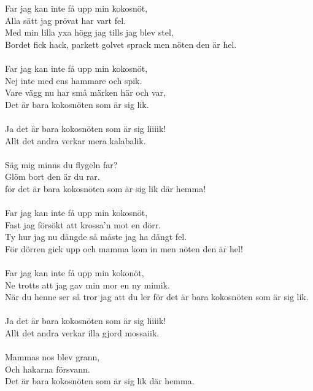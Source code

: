 \vspace{10pt}
\par
Far jag kan inte få upp min kokosnöt,\\
Alla sätt jag prövat har vart fel.\\
Med min lilla yxa högg jag tills jag blev stel,\\
Bordet fick hack, parkett golvet sprack men nöten den är hel.\\
\\
Far jag kan inte få upp min kokosnöt,\\
Nej inte med ens hammare och spik.\\
Vare vägg nu har små märken här och var,\\
Det är bara kokosnöten som är sig lik.\\
\\
Ja det är bara kokosnöten som är sig liiiik!\\
Allt det andra verkar mera kalabalik.\\
\\
Säg mig minns du flygeln far?\\
Glöm bort den är du rar.\\
för det är bara kokosnöten som är sig lik där hemma!\\
\\
Far jag kan inte få upp min kokosnöt,\\
Fast jag försökt att krossa'n mot en dörr.\\
Ty hur jag nu dängde så måste jag ha dängt fel.\\
För dörren gick upp och mamma kom in men nöten den är hel!\\
\\
Far jag kan inte få upp min kokonöt,\\
Ne trotts att jag gav min mor en ny mimik.\\
När du henne ser så tror jag att du ler för det är bara kokosnöten som är sig lik.\\
\\
Ja det är bara kokosnöten som är sig liiiik!\\
Allt det andra verkar illa gjord mossaiik.\\
\\
Mammas nos blev grann,\\
Och hakarna försvann.\\
Det är bara kokosnöten som är sig lik där hemma.\\
\\
